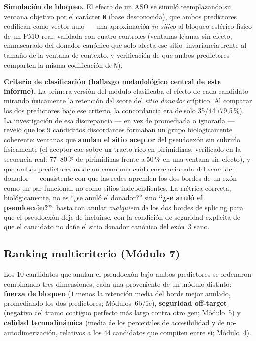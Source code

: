 \documentclass[11pt,a4paper]{article}
\begin{document}
\textbf{Simulación de bloqueo.} El efecto de un ASO se simuló reemplazando su ventana objetivo por el carácter \texttt{N} (base desconocida), que ambos predictores codifican como vector nulo --- una aproximación \emph{in silico} al bloqueo estérico físico de un PMO real, validada con cuatro controles (ventanas lejanas sin efecto, enmascarado del donador canónico que solo afecta ese sitio, invariancia frente al tamaño de la ventana de contexto, y verificación de que ambos predictores comparten la misma codificación de \texttt{N}).

\textbf{Criterio de clasificación (hallazgo metodológico central de este informe).} La primera versión del módulo clasificaba el efecto de cada candidato mirando únicamente la retención del score del \emph{sitio donador} críptico. Al comparar los dos predictores bajo ese criterio, la concordancia era de solo 35/44 (79{,}5\,\%). La investigación de esa discrepancia --- en vez de promediarla o ignorarla --- reveló que los 9 candidatos discordantes formaban un grupo biológicamente coherente: ventanas que \textbf{anulan el sitio aceptor} del pseudoexón sin cubrirlo físicamente (el aceptor cae sobre un tracto rico en pirimidinas, verificado en la secuencia real: 77--80\,\% de pirimidinas frente a 50\,\% en una ventana sin efecto), y que ambos predictores modelan como una caída correlacionada del score del donador --- consistente con que las redes aprenden los dos bordes de un exón como un par funcional, no como sitios independientes. La métrica correcta, biológicamente, no es ``¿se anuló el donador?'' sino \textbf{``¿se anuló el pseudoexón?''}: basta con anular \emph{cualquiera} de los dos bordes de splicing para que el pseudoexón deje de incluirse, con la condición de seguridad explícita de que el candidato no dañe el sitio donador canónico del exón~3 sano.

\subsection{Ranking multicriterio (Módulo 7)}

Los 10 candidatos que anulan el pseudoexón bajo ambos predictores se ordenaron combinando tres dimensiones, cada una proveniente de un módulo distinto: \textbf{fuerza de bloqueo} ($1$ menos la retención media del borde mejor anulado, promediando los dos predictores; Módulos~6b/6c), \textbf{seguridad off-target} (negativo del tramo contiguo perfecto más largo contra otro gen; Módulo~5) y \textbf{calidad termodinámica} (media de los percentiles de accesibilidad y de no-autodimerización, relativos a los 44 candidatos que compiten entre sí; Módulo~4).
\end{document}
